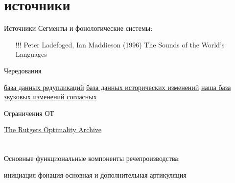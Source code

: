 \section{источники}
\begin{frame}{Источники}
Сегменты и фонологические системы:
\begin{itemize}
\mytem \href{http://www.lapsyd.ddl.ish-lyon.cnrs.fr/lapsyd/index.php}{LAPSyD}
\mytem \href{http://phonetics.ucla.edu/index/sounds.html}{UCLA Phonetics Lab data}
\mytem \href{http://phoible.org/}{PHOIBLE}
\mytem \href{http://eurasianphonology.info/}{The database of Eurasian phonological inventories}
\item[!!!] Peter Ladefoged, Ian Maddieson (1996) The Sounds of the World’s Languages
\end{itemize}
Чередования
\begin{itemize}
\mytem \href{http://reduplication.uni-graz.at/redup/}{база данных редупликаций}
\mytem \href{http://www.diadm.ish-lyon.cnrs.fr/unidia/index.php}{база данных исторических изменений}
\mytem \href{https://agricolamz.github.io/wcad/}{наша база звуковых изменений согласных}
\end{itemize}
Ограничения ОТ
\begin{itemize}
\mytem \href{http://roa.rutgers.edu/}{The Rutgers Optimality Archive}
\end{itemize}
\end{frame}

\section{}
\begin{frame}{Основные функциональные компоненты речепроизводства:} 
\begin{itemize}
\mytem инициация
\mytem фонация
\mytem основная и дополнительная артикуляция
\end{itemize}
\end{frame}
